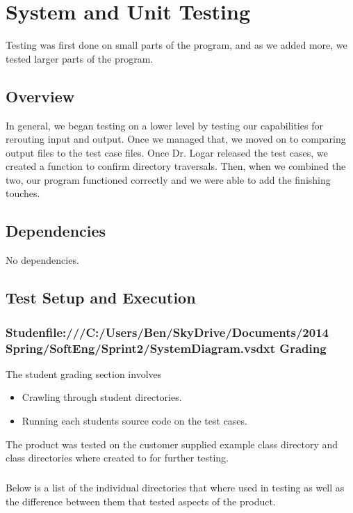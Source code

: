 
\chapter{System  and Unit Testing}

Testing was first done on small parts of the program, and as we added more, we tested larger parts of the program.

\section{Overview}
In general, we began testing on a lower level by testing our 
capabilities for rerouting input and output. Once we managed that,
we moved on to comparing output files to the test case files. Once Dr. 
Logar released the test cases, we created a function to confirm directory 
traversals. Then, when we combined the two, our program functioned correctly
and we were able to add the finishing touches.



\section{Dependencies}
No dependencies.


\section{Test Setup and Execution}
\subsection{Studenfile:///C:/Users/Ben/SkyDrive/Documents/2014 Spring/SoftEng/Sprint2/SystemDiagram.vsdxt Grading}
The student grading section involves
\begin{itemize}
\item Crawling through student directories.
\item Running each students source code on the test cases.
\end{itemize}
The product was tested on the customer supplied example class directory and class directories where created to for further testing.

\paragraph{} Below is a list of the individual directories that where used in testing as well as the difference between them that tested aspects of the product.

